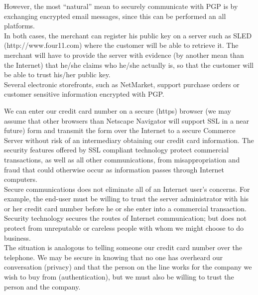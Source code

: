 \begin{htmllist}
    However, the most ``natural'' mean to securely communicate with PGP is
    by exchanging encrypted email messages, since this can be performed an
    all platforms.\\
    
    In both cases, the merchant can register his public key on a server
    such as SLED (http://www.four11.com) where the customer will be able to
    retrieve it. The merchant will have to provide the server with evidence
    (by another mean than the Internet) that he/she claims who he/she
    actually is, so that the customer will be able to trust his/her public
    key.\\
    
    Several electronic storefronts, such as NetMarket, support purchase
    orders or customer sensitive information encrypted with PGP.


    
    We can enter our credit card number on a secure (https) browser (we may
    assume that other browsers than Netscape Navigator will support SSL in
    a near future) form and transmit the form over the Internet to a secure
    Commerce Server without risk of an intermediary obtaining our credit
    card information. The security features offered by SSL compliant
    technology protect commercial transactions, as well as all other
    communications, from misappropriation and fraud that could otherwise
    occur as information passes through Internet computers.\\
    
    Secure communications does not eliminate all of an Internet user's
    concerns. For example, the end-user must be willing to trust the server
    administrator with his or her credit card number before he or she enter
    into a commercial transaction. Security technology secures the routes
    of Internet communication; but does not protect from unreputable or
    careless people with whom we might choose to do business.\\
    
    The situation is analogous to telling someone our credit card number
    over the telephone. We may be secure in knowing that no one has
    overheard our conversation (privacy) and that the person on the line
    works for the company we wish to buy from (authentication), but we must
    also be willing to trust the person and the company.\\
    

\end{htmllist}
